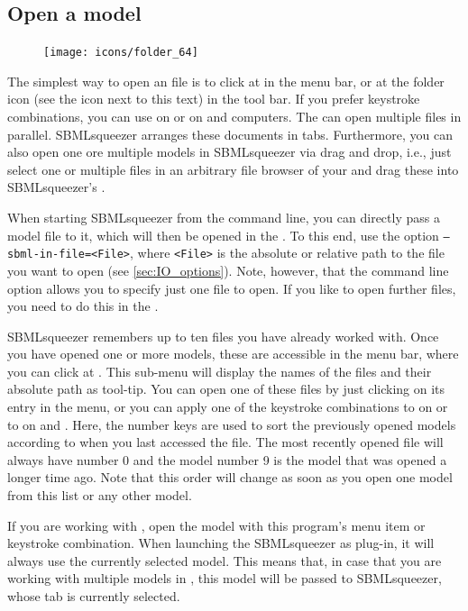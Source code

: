 \subsection{Open a model}

\begin{figure}
\vspace{\wrapfigspace}
\texttt{[image: icons/folder\_64]}
\end{figure}
The simplest way to open an \SBML file is to click at  in the
menu bar, or at the folder icon (see the icon next to this text) in the tool bar.
If you prefer keystroke combinations, you can use  on \MacOSX or
 on \Windows and \Linux computers.
The \GUI can open multiple \SBML files in parallel.
SBMLsqueezer arranges these \SBML documents in tabs.
Furthermore, you can also open one ore multiple models in SBMLsqueezer via drag and drop, i.e., just select one or multiple \SBML files in an arbitrary file browser of your \OS and drag these into SBMLsqueezer's \GUI.

When starting SBMLsqueezer from the command line, you can directly pass a model
file to it, which will then be opened in the \GUI. To this
end, use the option \texttt{--sbml-in-file=<File>}, where \texttt{<File>} is the
absolute or relative path to the \SBML file you want to open (see
\vref{sec:IO_options}).
Note, however, that the command line option allows you to specify just one file
to open.
If you like to open further files, you need to do this in the \GUI.

SBMLsqueezer remembers up to ten files you have already worked with.
Once you have opened one or more models, these are accessible in the menu bar,
where you can click at .
This sub-menu will display the names of the files and their absolute path as tool-tip.
You can open one of these files by just clicking on its entry in the menu, or
you can apply one of the keystroke combinations  to 
on \MacOSX or  to  on \Linux and \Windows.
Here, the number keys are used to sort the previously opened models according to
when you last accessed the file.
The most recently opened file will always have number 0 and the model number 9
is the model that was opened a longer time ago.
Note that this order will change as soon as you open one model from this list
or any other model.

If you are working with \CellDesigner, open the model with this program's menu item or keystroke combination.
When launching the SBMLsqueezer as \CellDesigner plug-in, it will always use the currently selected model.
This means that, in case that you are working with multiple models in \CellDesigner, this model will be passed to SBMLsqueezer, whose tab is currently selected.

